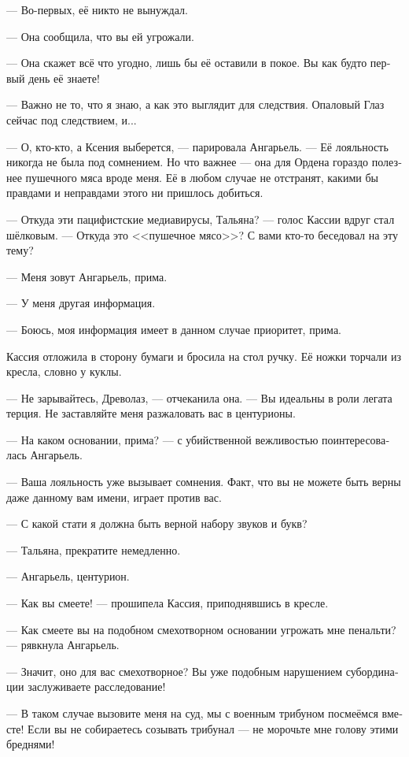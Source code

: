\documentclass[a4paper,12pt,fleqn]{book}\usepackage{polyglossia}\setdefaultlanguage[babelshorthands=true]{russian}\setotherlanguage{english}\defaultfontfeatures{Ligatures=TeX,Mapping=tex-text}\usepackage{xcolor}\newcommand{\ml}[3]{#2}
\begin{document}
--- Во-первых, её никто не вынуждал.

--- Она сообщила, что вы ей угрожали.

--- Она скажет всё что угодно, лишь бы её оставили в покое.
Вы как будто первый день её знаете!

--- Важно не то, что я знаю, а как это выглядит для следствия.
Опаловый Глаз сейчас под следствием, и...

--- О, кто-кто, а Ксения выберется, --- парировала Ангарьель.
--- Её лояльность никогда не была под сомнением.
Но что важнее --- она для Ордена гораздо полезнее пушечного мяса вроде меня.
Её в любом случае не отстранят, какими бы правдами и неправдами этого ни пришлось добиться.

--- Откуда эти пацифистские медиавирусы, Тальяна? --- голос Кассии вдруг стал шёлковым.
--- Откуда это <<пушечное мясо>>?
С вами кто-то беседовал на эту тему?

--- Меня зовут Ангарьель, прима.

--- У меня другая информация.

--- Боюсь, моя информация имеет в данном случае приоритет, прима.

Кассия отложила в сторону бумаги и бросила на стол ручку.
Её ножки торчали из кресла, словно у куклы.

--- Не зарывайтесь, Древолаз, --- отчеканила она.
--- Вы идеальны в роли легата терция.
Не заставляйте меня разжаловать вас в центурионы.

--- На каком основании, прима? --- с убийственной вежливостью поинтересовалась Ангарьель.

--- Ваша лояльность уже вызывает сомнения.
Факт, что вы не можете быть верны даже данному вам имени, играет против вас.

--- С какой стати я должна быть верной набору звуков и букв?

--- Тальяна, прекратите немедленно.

--- Ангарьель, центурион.

--- Как вы смеете! --- прошипела Кассия, приподнявшись в кресле.

--- Как смеете вы на подобном смехотворном основании угрожать мне пенальти? --- рявкнула Ангарьель.

--- Значит, оно для вас смехотворное?
Вы уже подобным нарушением субординации заслуживаете расследование!

--- В таком случае вызовите меня на суд, мы с военным трибуном посмеёмся вместе!
Если вы не собираетесь созывать трибунал --- не морочьте мне голову этими бреднями!
\end{document}
